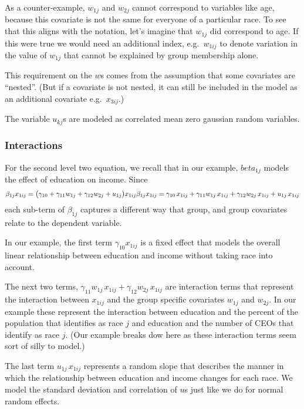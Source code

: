 \documentclass[
]{article}
\begin{document}
As a counter-example, \(w_{1j}\) and \(w_{2j}\) cannot correspond to
variables like age, because this covariate is not the same for everyone
of a particular race. To see that this aligns with the notation, let's
imagine that \(w_{1j}\) did correspond to age. If this were true we
would need an additional index, e.g.~\(w_{1ij}\) to denote variation in
the value of \(w_{1j}\) that cannot be explained by group membership
alone.

This requirement on the \(w\)s comes from the assumption that some
covariates are ``nested''. (But if a covariate is not nested, it can
still be included in the model as an additional covariate
e.g.~\(x_{3ij}\).)

The variable \(u_{kj}\)s are modeled as correlated mean zero gaussian
random variables.

\hypertarget{interactions}{%
\subsubsection{Interactions}\label{interactions}}

For the second level two equation, we recall that in our example,
\(beta_{1j}\) models the effect of education on income. Since \[
\beta_{1j} x_{1ij}=\big( \gamma_{10} + \gamma_{11}w_{1j} + \gamma_{12}w_{2j} + u_{1j} \big) x_{1ij} \\
\beta_{1j} x_{1ij}= \gamma_{10}\, x_{1ij} + \gamma_{11}w_{1j}\, x_{1ij} + \gamma_{12}w_{2j} \, x_{1ij} + u_{1j} \, x_{1ij}
\] each sub-term of \(\beta_{1j}\) captures a different way that group,
and group covariates relate to the dependent variable.

In our example, the first term \(\gamma_{10}x_{1ij}\) is a fixed effect
that models the overall linear relationship between education and income
without taking race into account.

The next two terms,
\(\gamma_{11}w_{1j}\, x_{1ij} + \gamma_{12}w_{2j} \, x_{1ij}\) are
interaction terms that represent the interaction between \(x_{1ij}\) and
the group specific covariates \(w_{1j}\) and \(w_{2j}\). In our example
these represent the interaction between education and the percent of the
population that identifies as race \(j\) and education and the number of
CEOs that identify as race \(j\). (Our example breaks dow here as these
interaction terms seem sort of silly to model.)

The last term \(u_{1j} \, x_{1ij}\) represents a random slope that
describes the manner in which the relationship between education and
income changes for each race. We model the standard deviation and
correlation of \(u\)s just like we do for normal random effects.
\end{document}
